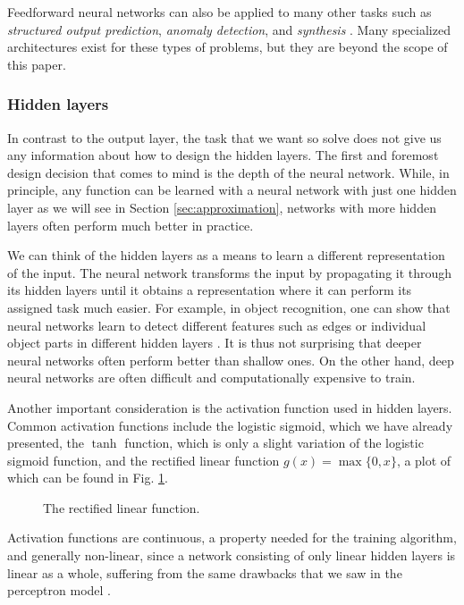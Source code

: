 Feedforward neural networks can also be applied to many other tasks such as \emph{structured output prediction}, \emph{anomaly detection}, and \emph{synthesis} \cite[Ch.\,5,\,pp.\,96-100]{DBLP:books/daglib/0040158}. Many specialized architectures exist for these types of problems, but they are beyond the scope of this paper.
\subsubsection{Hidden layers}
In contrast to the output layer, the task that we want so solve does not give us any information about how to design the hidden layers. The first and foremost design decision that comes to mind is the depth of the neural network. While, in principle, any function can be learned with a neural network with just one hidden layer as we will see in Section \ref{sec:approximation}, networks with more hidden layers often perform much better in practice.

We can think of the hidden layers as a means to learn a different representation of the input. The neural network transforms the input by propagating it through its hidden layers until it obtains a representation where it can perform its assigned task much easier. For example, in object recognition, one can show that neural networks learn to detect different features such as edges or individual object parts in different hidden layers \cite{DBLP:conf/eccv/ZeilerF14}. It is thus not surprising that deeper neural networks often perform better than shallow ones. On the other hand, deep neural networks are often difficult and computationally expensive to train.

Another important consideration is the activation function used in hidden layers. Common activation functions include the logistic sigmoid, which we have already presented, the $\tanh$ function, which is only a slight variation of the logistic sigmoid function, and the rectified linear function $g(x) = \max\{0,x\}$, a plot of which can be found in Fig. \ref{fig:relu}.

\begin{figure}
	\begin{center}
		
	\end{center}
	\caption{The rectified linear function.}
	\label{fig:relu}
\end{figure}

Activation functions are continuous, a property needed for the training algorithm, and generally non-linear, since a network consisting of only linear hidden layers is linear as a whole, suffering from the same drawbacks that we saw in the perceptron model \cite[Ch.\,6,\,p.\,190]{DBLP:books/daglib/0040158}.

